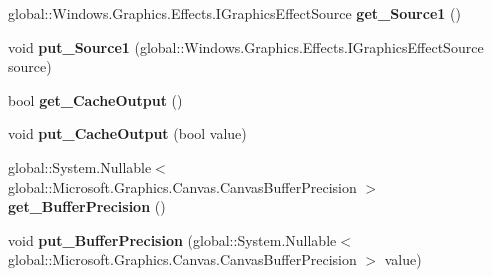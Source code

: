 \begin{DoxyCompactItemize}
\item 
\mbox{\label{class_microsoft_1_1_graphics_1_1_canvas_1_1_effects_1_1_cross_fade_effect_a515cb86c3b146b49a043c5a2f2fa0e34}} 
global\+::\+Windows.\+Graphics.\+Effects.\+I\+Graphics\+Effect\+Source {\bfseries get\+\_\+\+Source1} ()
\item 
\mbox{\label{class_microsoft_1_1_graphics_1_1_canvas_1_1_effects_1_1_cross_fade_effect_a72eb46d22afb55188148751eda6335e6}} 
void {\bfseries put\+\_\+\+Source1} (global\+::\+Windows.\+Graphics.\+Effects.\+I\+Graphics\+Effect\+Source source)
\item 
\mbox{\label{class_microsoft_1_1_graphics_1_1_canvas_1_1_effects_1_1_cross_fade_effect_a8e3589682f0d148492f35236f8ccfba7}} 
bool {\bfseries get\+\_\+\+Cache\+Output} ()
\item 
\mbox{\label{class_microsoft_1_1_graphics_1_1_canvas_1_1_effects_1_1_cross_fade_effect_a8332e6ad0fb1e1aceda5417f290ce62f}} 
void {\bfseries put\+\_\+\+Cache\+Output} (bool value)
\item 
\mbox{\label{class_microsoft_1_1_graphics_1_1_canvas_1_1_effects_1_1_cross_fade_effect_a0ca90f8254840e1cd6acb7017be2d7aa}} 
global\+::\+System.\+Nullable$<$ global\+::\+Microsoft.\+Graphics.\+Canvas.\+Canvas\+Buffer\+Precision $>$ {\bfseries get\+\_\+\+Buffer\+Precision} ()
\item 
\mbox{\label{class_microsoft_1_1_graphics_1_1_canvas_1_1_effects_1_1_cross_fade_effect_ad2ee508e3e5be9ddc1bdb048194edcf4}} 
void {\bfseries put\+\_\+\+Buffer\+Precision} (global\+::\+System.\+Nullable$<$ global\+::\+Microsoft.\+Graphics.\+Canvas.\+Canvas\+Buffer\+Precision $>$ value)
\item 
\mbox{\label{class_microsoft_1_1_graphics_1_1_canvas_1_1_effects_1_1_cross_fade_effect_ae3c0feec4d05fd40b5ddd7382e92ed4a}} 

\end{DoxyCompactItemize}
